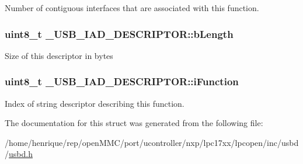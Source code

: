 Number of contiguous interfaces that are associated with this function. \hypertarget{struct__USB__IAD__DESCRIPTOR_a479007e955942af951b4f600a93f7453}{
\subsubsection[{b\-Length}]{\setlength{\rightskip}{0pt plus 5cm}uint8\-\_\-t \-\_\-\-U\-S\-B\-\_\-\-I\-A\-D\-\_\-\-D\-E\-S\-C\-R\-I\-P\-T\-O\-R\-::b\-Length}}\label{struct__USB__IAD__DESCRIPTOR_a479007e955942af951b4f600a93f7453}
Size of this descriptor in bytes \hypertarget{struct__USB__IAD__DESCRIPTOR_a486ad14fb6b12d498212061b9610ce02}{
\subsubsection[{i\-Function}]{\setlength{\rightskip}{0pt plus 5cm}uint8\-\_\-t \-\_\-\-U\-S\-B\-\_\-\-I\-A\-D\-\_\-\-D\-E\-S\-C\-R\-I\-P\-T\-O\-R\-::i\-Function}}\label{struct__USB__IAD__DESCRIPTOR_a486ad14fb6b12d498212061b9610ce02}
Index of string descriptor describing this function. 

The documentation for this struct was generated from the following file\-:\begin{DoxyCompactItemize}
\item 
/home/henrique/rep/open\-M\-M\-C/port/ucontroller/nxp/lpc17xx/lpcopen/inc/usbd/\hyperlink{usbd_8h}{usbd.\-h}\end{DoxyCompactItemize}
